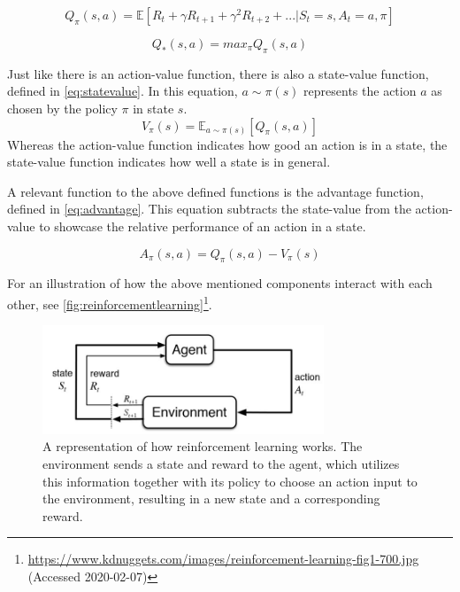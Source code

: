 \documentclass{kththesis}
\begin{document}
\begin{equation}
\label{eq:qfunction}
Q_\pi(s, a) = \mathbb{E}[R_t + \gamma R_{t+1} + \gamma^2R_{t+2} + ... | S_t = s, A_t = a, \pi]
\end{equation}

\begin{equation}
\label{eq:qoptimal}
Q_*(s, a) = max_\pi Q_\pi(s, a)
\end{equation}

Just like there is an action-value function, there is also a state-value function, defined in \autoref{eq:statevalue}. In this equation, $a\sim\pi(s)$ represents the action $a$ as chosen by the policy $\pi$ in state $s$.
\begin{equation}
\label{eq:statevalue}
V_\pi(s) = \mathbb{E}_{a\sim\pi(s)}[Q_\pi(s,a)]
\end{equation}
Whereas the action-value function indicates how good an action is in a state, the state-value function indicates how well a state is in general. \parencite{wang2015dueling}

A relevant function to the above defined functions is the advantage function, defined in \autoref{eq:advantage}. This equation subtracts the state-value from the action-value to showcase the relative performance of an action in a state. \parencite{wang2015dueling}

\begin{equation}
\label{eq:advantage}
A_\pi(s,a) = Q_\pi(s,a) - V_\pi(s)
\end{equation}

For an illustration of how the above mentioned components interact with each other, see \autoref{fig:reinforcementlearning}\footnote{\url{https://www.kdnuggets.com/images/reinforcement-learning-fig1-700.jpg} (Accessed 2020-02-07)}.

\begin{figure}
\centering
\includegraphics[width=0.75\textwidth]{reinforcement-learning.jpg}
\caption{A representation of how reinforcement learning works. The environment sends a state and reward to the agent, which utilizes this information together with its policy to choose an action input to the environment, resulting in a new state and a corresponding reward.}
\label{fig:reinforcementlearning}
\end{figure}
\end{document}
